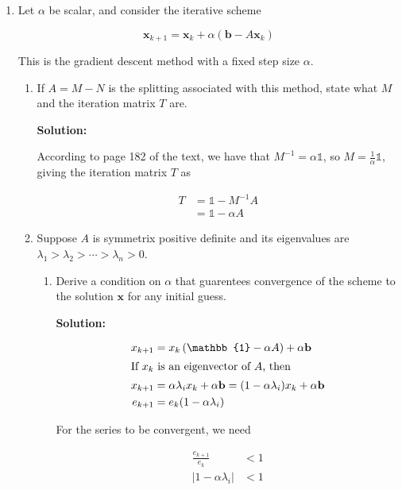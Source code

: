 \documentclass[12pt]{article}
\newcommand{\abs}[1]{\left| #1 \right|}
\newcommand{\vect}{\mathbf}
\newcommand{\Id}{\mathbb{1}}
\newcommand{\inv}[1]{ #1^{-1}}
\begin{document}
\begin{enumerate}
\begin{enumerate}
  {\bf Solution:}
\end{enumerate}

\item Let $\alpha$ be scalar, and consider the iterative scheme

\[
\mathbf{x}_{k+1} = \mathbf{x}_{k} + \alpha\left(\mathbf{b} - A\mathbf{x}_{k} \right)
\]

This is the gradient descent method with a fixed step size $\alpha$.

\begin{enumerate}
  \item If $A = M - N$ is the splitting associated with this method, state what $M$
  and the iteration matrix $T$ are.

  {\bf Solution:}

  According to page 182 of the text, we have that $\inv{M} = \alpha \Id$, so $M = \frac{1}{\alpha}\Id$,
  giving the iteration matrix $T$ as

  \begin{align*}
    T &= \Id - \inv{M}A\\
      &= \Id - \alpha A
  \end{align*}

  \item Suppose $A$ is symmetrix positive definite and its eigenvalues are
  $\lambda_{1} > \lambda_{2} > \cdots > \lambda_{n} > 0$.

  \begin{enumerate}
    \item Derive a condition on $\alpha$ that guarentees convergence of the
    scheme to the solution $\mathbf{x}$ for any initial guess.

    {\bf Solution:}

    \begin{align*}
      x_{k+1} &= x_{k}\left( \Id - \alpha A\right) + \alpha \vect{b}\\
      \intertext{If $x_{k}$ is an eigenvector of $A$, then}
      x_{k+1} &= \alpha \lambda_{i} x_{k} + \alpha \vect{b} = (1 - \alpha \lambda_{i})x_{k} + \alpha \vect{b}\\
      e_{k+1} &= e_{k}(1 - \alpha \lambda_{i})
    \end{align*}

    For the series to be convergent, we need

    \begin{align*}
      \frac{e_{k+1}}{e_{k}} &< 1\\
      \abs{1 - \alpha \lambda_{i}} &< 1
    \end{align*}


\end{enumerate}
\end{enumerate}
\end{enumerate}
\end{document}
